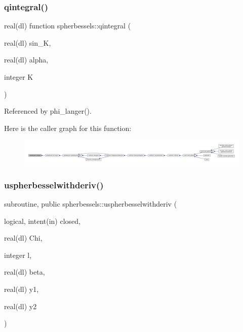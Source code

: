 \subsubsection{\texorpdfstring{qintegral()}{qintegral()}}
{\footnotesize\ttfamily real(dl) function spherbessels\+::qintegral (\begin{DoxyParamCaption}\item[{real(dl)}]{sin\+\_\+K,  }\item[{real(dl)}]{alpha,  }\item[{integer}]{K }\end{DoxyParamCaption})\hspace{0.3cm}{\ttfamily [private]}}



Referenced by phi\+\_\+langer().

Here is the caller graph for this function\+:
\nopagebreak
\begin{figure}[H]
\begin{center}
\leavevmode
\includegraphics[width=350pt]{namespacespherbessels_ae89051535f9e9606be1ab046f5a77854_icgraph}
\end{center}
\end{figure}
\mbox{\label{namespacespherbessels_a19f6db59afef649058999b63f9ab8f65}} 
\subsubsection{\texorpdfstring{uspherbesselwithderiv()}{uspherbesselwithderiv()}}
{\footnotesize\ttfamily subroutine, public spherbessels\+::uspherbesselwithderiv (\begin{DoxyParamCaption}\item[{logical, intent(in)}]{closed,  }\item[{real(dl)}]{Chi,  }\item[{integer}]{l,  }\item[{real(dl)}]{beta,  }\item[{real(dl)}]{y1,  }\item[{real(dl)}]{y2 }\end{DoxyParamCaption})}



